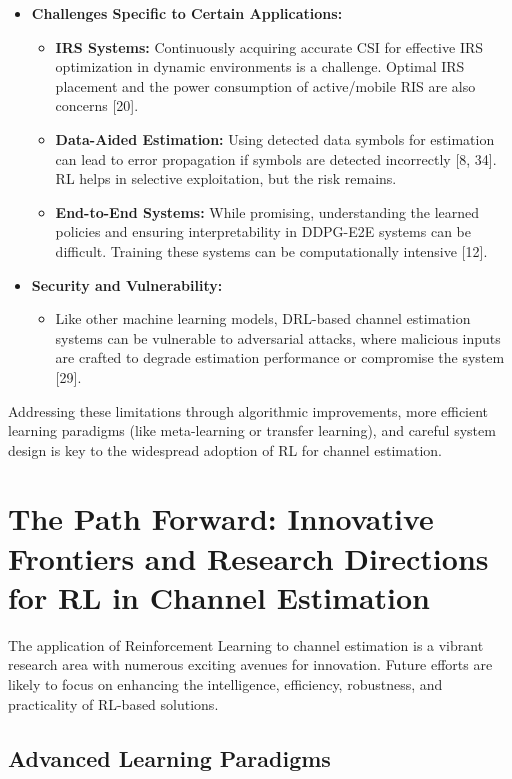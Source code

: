 \documentclass[journal,twocolumn]{IEEEtran}
\begin{document}
\begin{itemize}
    \item \textbf{Challenges Specific to Certain Applications:}
        \begin{itemize}
            \item \textbf{IRS Systems:} Continuously acquiring accurate CSI for effective IRS optimization in dynamic environments is a challenge. Optimal IRS placement and the power consumption of active/mobile RIS are also concerns [20].
            \item \textbf{Data-Aided Estimation:} Using detected data symbols for estimation can lead to error propagation if symbols are detected incorrectly [8, 34]. RL helps in selective exploitation, but the risk remains.
            \item \textbf{End-to-End Systems:} While promising, understanding the learned policies and ensuring interpretability in DDPG-E2E systems can be difficult. Training these systems can be computationally intensive [12].
        \end{itemize}
    \item \textbf{Security and Vulnerability:}
        \begin{itemize}
            \item Like other machine learning models, DRL-based channel estimation systems can be vulnerable to adversarial attacks, where malicious inputs are crafted to degrade estimation performance or compromise the system [29].
        \end{itemize}
\end{itemize}
Addressing these limitations through algorithmic improvements, more efficient learning paradigms (like meta-learning or transfer learning), and careful system design is key to the widespread adoption of RL for channel estimation.

\section{The Path Forward: Innovative Frontiers and Research Directions for RL in Channel Estimation}
The application of Reinforcement Learning to channel estimation is a vibrant research area with numerous exciting avenues for innovation. Future efforts are likely to focus on enhancing the intelligence, efficiency, robustness, and practicality of RL-based solutions.

\subsection{Advanced Learning Paradigms}
\end{document}
